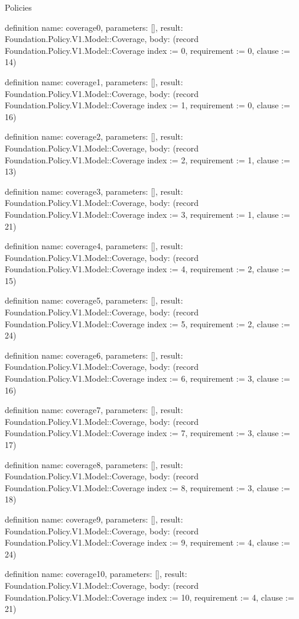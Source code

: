 \begin{lexlean}{Policies}
\begin{semanticmodule}
definition{
  name: coverage0,
  parameters: [],
  result: Foundation.Policy.V1.Model::Coverage,
  body: (record Foundation.Policy.V1.Model::Coverage {index := 0, requirement := 0, clause := 14})
}

definition{
  name: coverage1,
  parameters: [],
  result: Foundation.Policy.V1.Model::Coverage,
  body: (record Foundation.Policy.V1.Model::Coverage {index := 1, requirement := 0, clause := 16})
}

definition{
  name: coverage2,
  parameters: [],
  result: Foundation.Policy.V1.Model::Coverage,
  body: (record Foundation.Policy.V1.Model::Coverage {index := 2, requirement := 1, clause := 13})
}

definition{
  name: coverage3,
  parameters: [],
  result: Foundation.Policy.V1.Model::Coverage,
  body: (record Foundation.Policy.V1.Model::Coverage {index := 3, requirement := 1, clause := 21})
}

definition{
  name: coverage4,
  parameters: [],
  result: Foundation.Policy.V1.Model::Coverage,
  body: (record Foundation.Policy.V1.Model::Coverage {index := 4, requirement := 2, clause := 15})
}

definition{
  name: coverage5,
  parameters: [],
  result: Foundation.Policy.V1.Model::Coverage,
  body: (record Foundation.Policy.V1.Model::Coverage {index := 5, requirement := 2, clause := 24})
}

definition{
  name: coverage6,
  parameters: [],
  result: Foundation.Policy.V1.Model::Coverage,
  body: (record Foundation.Policy.V1.Model::Coverage {index := 6, requirement := 3, clause := 16})
}

definition{
  name: coverage7,
  parameters: [],
  result: Foundation.Policy.V1.Model::Coverage,
  body: (record Foundation.Policy.V1.Model::Coverage {index := 7, requirement := 3, clause := 17})
}

definition{
  name: coverage8,
  parameters: [],
  result: Foundation.Policy.V1.Model::Coverage,
  body: (record Foundation.Policy.V1.Model::Coverage {index := 8, requirement := 3, clause := 18})
}

definition{
  name: coverage9,
  parameters: [],
  result: Foundation.Policy.V1.Model::Coverage,
  body: (record Foundation.Policy.V1.Model::Coverage {index := 9, requirement := 4, clause := 24})
}

definition{
  name: coverage10,
  parameters: [],
  result: Foundation.Policy.V1.Model::Coverage,
  body: (record Foundation.Policy.V1.Model::Coverage {index := 10, requirement := 4, clause := 21})
}


\end{semanticmodule}
\end{lexlean}
